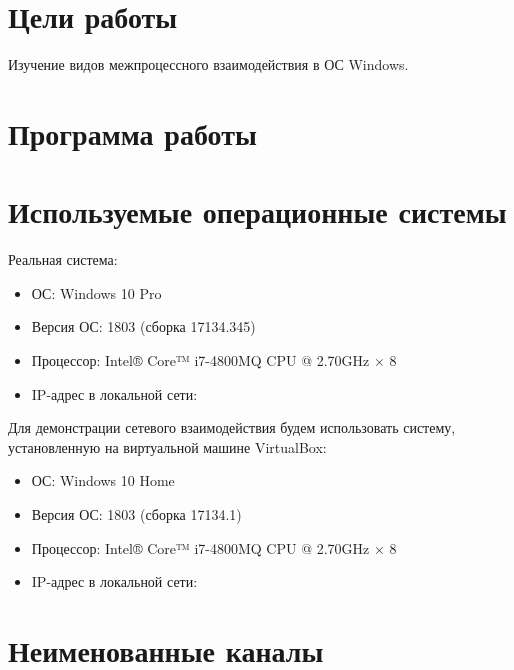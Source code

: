 





\tableofcontents
\newpage

\section{Цели работы}

Изучение видов межпроцессного взаимодействия в ОС Windows.

\section{Программа работы}



\section{Используемые операционные системы}

Реальная система:
\begin{itemize}
	\item ОС: Windows 10 Pro
	\item Версия ОС: 1803 (сборка 17134.345)
	\item Процессор: Intel® Core™ i7-4800MQ CPU @ 2.70GHz × 8
	\item IP-адрес в локальной сети: 
\end{itemize}



Для демонстрации сетевого взаимодействия будем использовать систему, установленную на виртуальной машине VirtualBox:
\begin{itemize}
	\item ОС: Windows 10 Home
	\item Версия ОС: 1803 (сборка 17134.1)
	\item Процессор: Intel® Core™ i7-4800MQ CPU @ 2.70GHz × 8
	\item IP-адрес в локальной сети: 
\end{itemize}



\section{Неименованные каналы}

